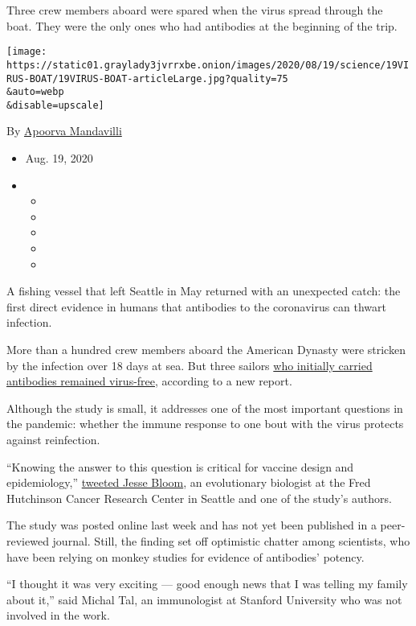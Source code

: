 Three crew members aboard were spared when the virus spread through the
boat. They were the only ones who had antibodies at the beginning of the
trip.

\texttt{[image: https://static01.graylady3jvrrxbe.onion/images/2020/08/19/science/19VIRUS-BOAT/19VIRUS-BOAT-articleLarge.jpg?quality=75\\\&auto=webp\\\&disable=upscale]}

By
\href{https://www.nytimes3xbfgragh.onion/by/apoorva-mandavilli}{Apoorva
Mandavilli}

\begin{itemize}
\item
  Aug. 19, 2020
\item
  \begin{itemize}
  \item
  \item
  \item
  \item
  \item
  \end{itemize}
\end{itemize}

A fishing vessel that left Seattle in May returned with an unexpected
catch: the first direct evidence in humans that antibodies to the
coronavirus can thwart infection.

More than a hundred crew members aboard the American Dynasty were
stricken by the infection over 18 days at sea. But three sailors
\href{https://www.medrxiv.org/content/10.1101/2020.08.13.20173161v1}{who
initially carried antibodies remained virus-free,} according to a new
report.

Although the study is small, it addresses one of the most important
questions in the pandemic: whether the immune response to one bout with
the virus protects against reinfection.

``Knowing the answer to this question is critical for vaccine design and
epidemiology,''
\href{https://twitter.com/jbloom_lab/status/1294378351809855490}{tweeted
Jesse Bloom}, an evolutionary biologist at the Fred Hutchinson Cancer
Research Center in Seattle and one of the study's authors.

The study was posted online last week and has not yet been published in
a peer-reviewed journal. Still, the finding set off optimistic chatter
among scientists, who have been relying on monkey studies for evidence
of antibodies' potency.

``I thought it was very exciting --- good enough news that I was telling
my family about it,'' said Michal Tal, an immunologist at Stanford
University who was not involved in the work.

